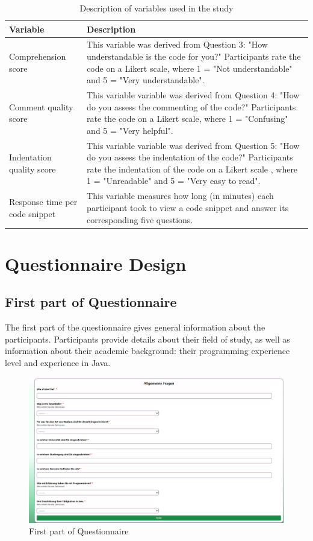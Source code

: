 \begin{table}[ht]
\centering
\small
\begin{tabular}{|p{4cm}|p{10cm}|}
\hline
\textbf{Variable} & \textbf{Description} \\
\hline
Comprehension score & This variable was derived from Question 3: "How understandable is the code for you?" Participants rate the code on a Likert scale, where 1 = "Not understandable" and  5 = "Very understandable".  \\
\hline
Comment quality score & This variable variable was derived from Question 4: "How do you assess the commenting of the code?" Participants rate the code on a Likert scale, where 1 = "Confusing" and 5  = "Very helpful". \\
\hline
Indentation quality score & This variable variable was derived from Question 5: "How do you assess the indentation of the code?" Participants rate the indentation of the code on  a Likert scale , where 1 = "Unreadable" and 5 = "Very easy to read". \\
\hline
Response time per code snippet & This variable measures how long (in minutes) each participant took to view a code snippet and answer its corresponding five questions.  \\
\hline
\end{tabular}
\caption{Description of variables used in the study}
\label{tab:variables}
\end{table}



\section{Questionnaire Design}


\subsection{First part of Questionnaire}
The first part of the questionnaire gives general information about the participants. 
Participants provide details about their field of study, as well as information about their academic background: their programming experience level and experience in Java.

\begin{figure} [H]
  \centering
  \includegraphics[scale=0.45]{figures/allgemein.png}
  \caption{First part of Questionnaire}
  \label{fig:AnhangsChor}
\end{figure}


